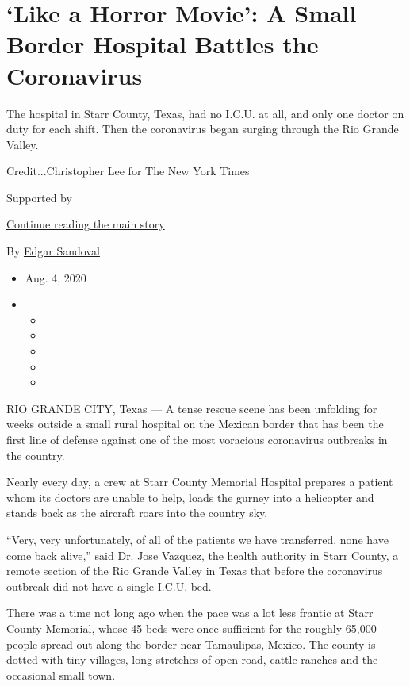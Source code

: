 \hypertarget{like-a-horror-movie-a-small-border-hospital-battles-the-coronavirus}{%
\section{`Like a Horror Movie': A Small Border Hospital Battles the
Coronavirus}\label{like-a-horror-movie-a-small-border-hospital-battles-the-coronavirus}}

The hospital in Starr County, Texas, had no I.C.U. at all, and only one
doctor on duty for each shift. Then the coronavirus began surging
through the Rio Grande Valley.

Credit...Christopher Lee for The New York Times

Supported by

\protect\hyperlink{after-sponsor}{Continue reading the main story}

By \href{https://www.nytimes.com/by/edgar-sandoval}{Edgar Sandoval}

\begin{itemize}
\item
  Aug. 4, 2020
\item
  \begin{itemize}
  \item
  \item
  \item
  \item
  \item
  \end{itemize}
\end{itemize}

RIO GRANDE CITY, Texas --- A tense rescue scene has been unfolding for
weeks outside a small rural hospital on the Mexican border that has been
the first line of defense against one of the most voracious coronavirus
outbreaks in the country.

Nearly every day, a crew at Starr County Memorial Hospital prepares a
patient whom its doctors are unable to help, loads the gurney into a
helicopter and stands back as the aircraft roars into the country sky.

``Very, very unfortunately, of all of the patients we have transferred,
none have come back alive,'' said Dr. Jose Vazquez, the health authority
in Starr County, a remote section of the Rio Grande Valley in Texas that
before the coronavirus outbreak did not have a single I.C.U. bed.

There was a time not long ago when the pace was a lot less frantic at
Starr County Memorial, whose 45 beds were once sufficient for the
roughly 65,000 people spread out along the border near Tamaulipas,
Mexico. The county is dotted with tiny villages, long stretches of open
road, cattle ranches and the occasional small town.

